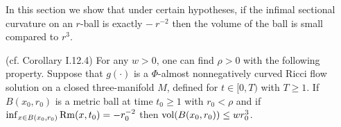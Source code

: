 In this section we show that under certain hypotheses, if the infimal sectional
curvature on an $r$-ball is exactly $- \: r^{-2}$ then the volume of the ball
is small compared to $r^3$.

\begin{corollary}
  \label{cor:kl-small-balls-strongly-negative-curvature-volume-collapsed-positivity-curvature}
 (cf. Corollary I.12.4) \label{corI.12.4}
For any $w > 0$, one can find $\rho > 0$ with the following property.
Suppose that $g(\cdot)$ is a $\Phi$-almost nonnegatively curved
Ricci flow solution on a closed three-manifold $M$, defined for
$t \in [0, T)$ with $T \ge 1$. If $B(x_0, r_0)$ is a metric ball
at time $t_0 \ge 1$ with $r_0 < \rho$ and if
$\inf_{x \in B(x_0,r_0)}  \operatorname{Rm}(x, t_0)  = - r_0^{-2}$ then
$\operatorname{vol}(B(x_0, r_0)) \le w r_0^3$.
\end{corollary}
